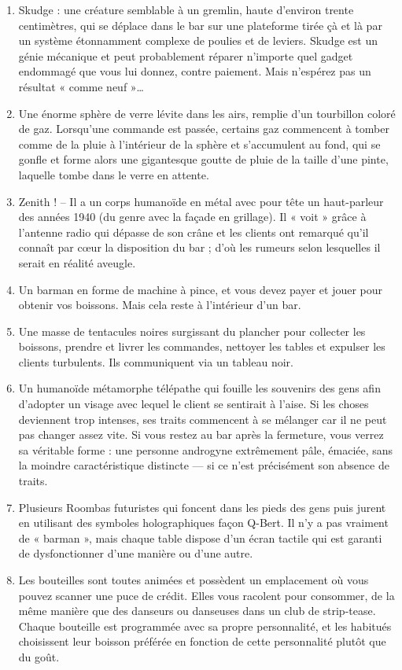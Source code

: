 \documentclass{article}
\begin{document}
\begin{enumerate}
	\item Skudge : une créature semblable à un gremlin, haute d’environ trente centimètres, qui se déplace dans le bar sur une plateforme tirée çà et là par un système étonnamment complexe de poulies et de leviers. Skudge est un génie mécanique et peut probablement réparer n’importe quel gadget endommagé que vous lui donnez, contre paiement. Mais n’espérez pas un résultat « comme neuf »…
	\item Une énorme sphère de verre lévite dans les airs, remplie d’un tourbillon coloré de gaz. Lorsqu’une commande est passée, certains gaz commencent à tomber comme de la pluie à l’intérieur de la sphère et s’accumulent au fond, qui se gonfle et forme alors une gigantesque goutte de pluie de la taille d’une pinte, laquelle tombe dans le verre en attente.
	\item Zenith ! – Il a un corps humanoïde en métal avec pour tête un haut-parleur des années 1940 (du genre avec la façade en grillage). Il « voit » grâce à l’antenne radio qui dépasse de son crâne et les clients ont remarqué qu’il connaît par cœur la disposition du bar ; d’où les rumeurs selon lesquelles il serait en réalité aveugle.
	\item Un barman en forme de machine à pince, et vous devez payer et jouer pour obtenir vos boissons. Mais cela reste à l’intérieur d’un bar.
	\item Une masse de tentacules noires surgissant du plancher pour collecter les boissons, prendre et livrer les commandes, nettoyer les tables et expulser les clients turbulents. Ils communiquent via un tableau noir.
	\item Un humanoïde métamorphe télépathe qui fouille les souvenirs des gens afin d’adopter un visage avec lequel le client se sentirait à l’aise. Si les choses deviennent trop intenses, ses traits commencent à se mélanger car il ne peut pas changer assez vite. Si vous restez au bar après la fermeture, vous verrez sa véritable forme : une personne androgyne extrêmement pâle, émaciée, sans la moindre caractéristique distincte — si ce n’est précisément son absence de traits.
	\item Plusieurs Roombas futuristes qui foncent dans les pieds des gens puis jurent en utilisant des symboles holographiques façon Q-Bert. Il n’y a pas vraiment de « barman », mais chaque table dispose d’un écran tactile qui est garanti de dysfonctionner d’une manière ou d’une autre.
	\item Les bouteilles sont toutes animées et possèdent un emplacement où vous pouvez scanner une puce de crédit. Elles vous racolent pour consommer, de la même manière que des danseurs ou danseuses dans un club de strip-tease. Chaque bouteille est programmée avec sa propre personnalité, et les habitués choisissent leur boisson préférée en fonction de cette personnalité plutôt que du goût.

\end{enumerate}
\end{document}
